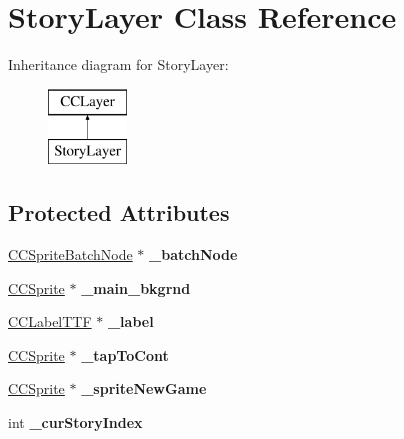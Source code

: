 \hypertarget{interface_story_layer}{\section{Story\-Layer Class Reference}
\label{interface_story_layer}
}
Inheritance diagram for Story\-Layer\-:\begin{figure}[H]
\begin{center}
\leavevmode
\includegraphics[height=2.000000cm]{interface_story_layer}
\end{center}
\end{figure}
\subsection*{Protected Attributes}
\begin{DoxyCompactItemize}
\item 
\hypertarget{interface_story_layer_a75d7f3f9129f21bc6ba082058920e860}{\hyperlink{interface_c_c_sprite_batch_node}{C\-C\-Sprite\-Batch\-Node} $\ast$ {\bfseries \-\_\-batch\-Node}}\label{interface_story_layer_a75d7f3f9129f21bc6ba082058920e860}

\item 
\hypertarget{interface_story_layer_a1914f26213a3c8f3c4fa744d439b164d}{\hyperlink{class_c_c_sprite}{C\-C\-Sprite} $\ast$ {\bfseries \-\_\-main\-\_\-bkgrnd}}\label{interface_story_layer_a1914f26213a3c8f3c4fa744d439b164d}

\item 
\hypertarget{interface_story_layer_a10628a087798a5bee23de965cb6ce57a}{\hyperlink{class_c_c_label_t_t_f}{C\-C\-Label\-T\-T\-F} $\ast$ {\bfseries \-\_\-label}}\label{interface_story_layer_a10628a087798a5bee23de965cb6ce57a}

\item 
\hypertarget{interface_story_layer_af877905057acc34205af5e8aa58a65fb}{\hyperlink{class_c_c_sprite}{C\-C\-Sprite} $\ast$ {\bfseries \-\_\-tap\-To\-Cont}}\label{interface_story_layer_af877905057acc34205af5e8aa58a65fb}

\item 
\hypertarget{interface_story_layer_a1bffcf7d1a8b1e0735810fb1edeb7b56}{\hyperlink{class_c_c_sprite}{C\-C\-Sprite} $\ast$ {\bfseries \-\_\-sprite\-New\-Game}}\label{interface_story_layer_a1bffcf7d1a8b1e0735810fb1edeb7b56}

\item 
\hypertarget{interface_story_layer_a02bb4e407ca75b8a10b4b2522172c0f8}{int {\bfseries \-\_\-cur\-Story\-Index}}\label{interface_story_layer_a02bb4e407ca75b8a10b4b2522172c0f8}

\end{DoxyCompactItemize}

